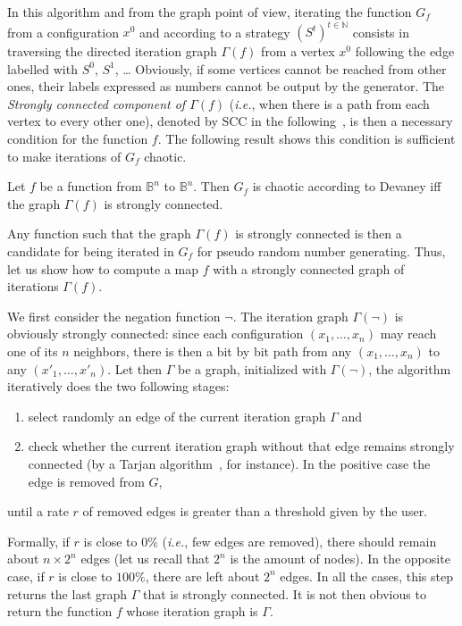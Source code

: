 In this algorithm and from the graph point of view, 
iterating the function $G_f$ from a configuration $x^0$
and according to a strategy $(S^t)^{t \in \mathds{N}}$  
consists in traversing the directed iteration graph $\Gamma(f)$
from a vertex $x^0$ following the edge labelled with $S^0$, $S^1$, \ldots
Obviously, if some vertices cannot be reached from other ones,
their labels expressed as numbers cannot be output by the generator.
The \emph{Strongly connected component of $\Gamma(f)$}
(\textit{i.e.}, when there is a path from each vertex to every other one),
denoted by SCC in the following~\cite{ita09},
is then a necessary condition for the function $f$.   
The following result shows this condition is sufficient to make 
iterations of $G_f$ chaotic.

\begin{theorem}
\label{Thchaotiques}  
Let  $f$ be a function from $\mathds{B}^{n}$ to  $\mathds{B}^{n}$. Then 
$G_f$ is chaotic  according to  Devaney iff the graph
$\Gamma(f)$ is strongly connected.
\end{theorem}

Any function such that the graph $\Gamma(f)$ is strongly connected
is then a candidate for being iterated in $G_f$
for pseudo random number generating. 
Thus, let us show how to compute a map $f$ 
with a strongly connected graph of iterations $\Gamma(f)$.

We first consider the negation function $\neg$. The iteration graph 
$\Gamma(\neg)$ is obviously strongly connected:
since each configuration $(x_1,\ldots, x_n)$ may reach one of its $n$ neighbors,
there is then a bit by bit path from any 
$(x_1,\ldots, x_n)$ to any $(x'_1,\ldots, x'_n)$.
Let then $\Gamma$ be a graph, initialized with $\Gamma(\neg)$, 
the algorithm iteratively does the two following stages: 
\begin{enumerate}
\item select randomly an edge of the current iteration graph $\Gamma$ and
\item check whether the current iteration graph without that edge 
  remains strongly connected (by a Tarjan algorithm~\cite{Tarjanscc72}, for instance). In the positive case the edge is removed from $G$,
\end{enumerate}
until a rate $r$ of removed edges is greater
than a threshold given by the user.

Formally, if $r$ is close to $0\%$ (\textit{i.e.}, few edges are removed), 
there should remain about $n\times 2^n$ edges (let us recall that $2^n$ is the amount of nodes).
In the opposite case, if $r$ is close to $100\%$, there are left about $2^n$
edges.
In all the cases, this step returns the last graph $\Gamma$ 
that is strongly connected.  
It is not then obvious to return the function $f$ whose iteration
graph is $\Gamma$.

